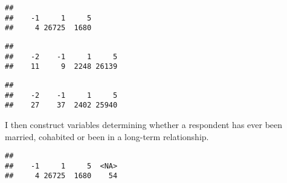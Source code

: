 \documentclass[
]{article}
\newenvironment{Shaded}{\begin{snugshade}}{\end{snugshade}}
\newcommand{\AttributeTok}[1]{\textcolor[rgb]{0.77,0.63,0.00}{#1}}
\newcommand{\CommentTok}[1]{\textcolor[rgb]{0.56,0.35,0.01}{\textit{#1}}}
\newcommand{\DecValTok}[1]{\textcolor[rgb]{0.00,0.00,0.81}{#1}}
\newcommand{\FunctionTok}[1]{\textcolor[rgb]{0.00,0.00,0.00}{#1}}
\newcommand{\NormalTok}[1]{#1}
\newcommand{\OtherTok}[1]{\textcolor[rgb]{0.56,0.35,0.01}{#1}}
\newcommand{\SpecialCharTok}[1]{\textcolor[rgb]{0.00,0.00,0.00}{#1}}
\newcommand{\StringTok}[1]{\textcolor[rgb]{0.31,0.60,0.02}{#1}}
\begin{document}
\begin{verbatim}
## 
##    -1     1     5 
##     4 26725  1680
\end{verbatim}

\begin{Shaded}
\end{Shaded}

\begin{verbatim}
## 
##    -2    -1     1     5 
##    11     9  2248 26139
\end{verbatim}

\begin{Shaded}
\end{Shaded}

\begin{verbatim}
## 
##    -2    -1     1     5 
##    27    37  2402 25940
\end{verbatim}

I then construct variables determining whether a respondent has ever
been married, cohabited or been in a long-term relationship.

\begin{Shaded}
\end{Shaded}

\begin{verbatim}
## 
##    -1     1     5  <NA> 
##     4 26725  1680    54
\end{verbatim}

\begin{Shaded}
\end{Shaded}
\end{document}
